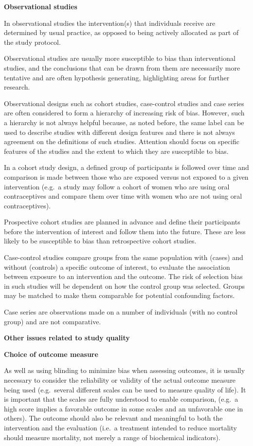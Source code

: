 \documentclass[
  10pt,
  a4paper,
  DIV=11,
  numbers=noendperiod]{scrreprt}
\begin{document}
\textbf{Observational studies}

In observational studies the intervention(s) that individuals receive
are determined by usual practice, as opposed to being actively allocated
as part of the study protocol.

Observational studies are usually more susceptible to bias than
interventional studies, and the conclusions that can be drawn from them
are necessarily more tentative and are often hypothesis generating,
highlighting areas for further research.

Observational designs such as cohort studies, case-control studies and
case series are often considered to form a hierarchy of increasing risk
of bias. However, such a hierarchy is not always helpful because, as
noted before, the same label can be used to describe studies with
different design features and there is not always agreement on the
definitions of such studies. Attention should focus on specific features
of the studies and the extent to which they are susceptible to bias.

In a cohort study design, a defined group of participants is followed
over time and comparison is made between those who are exposed versus
not exposed to a given intervention (e.g.~a study may follow a cohort of
women who are using oral contraceptives and compare them over time with
women who are not using oral contraceptives).

Prospective cohort studies are planned in advance and define their
participants before the intervention of interest and follow them into
the future. These are less likely to be susceptible to bias than
retrospective cohort studies.

Case-control studies compare groups from the same population with
(cases) and without (controls) a specific outcome of interest, to
evaluate the association between exposure to an intervention and the
outcome. The risk of selection bias in such studies will be dependent on
how the control group was selected. Groups may be matched to make them
comparable for potential confounding factors.

Case series are observations made on a number of individuals (with no
control group) and are not comparative.

\textbf{Other issues related to study quality}

\textbf{Choice of outcome measure}

As well as using blinding to minimize bias when assessing outcomes, it
is usually necessary to consider the reliability or validity of the
actual outcome measure being used (e.g.~several different scales can be
used to measure quality of life). It is important that the scales are
fully understood to enable comparison, (e.g.~a high score implies a
favorable outcome in some scales and an unfavorable one in others). The
outcome should also be relevant and meaningful to both the intervention
and the evaluation (i.e.~a treatment intended to reduce mortality should
measure mortality, not merely a range of biochemical indicators).
\end{document}
